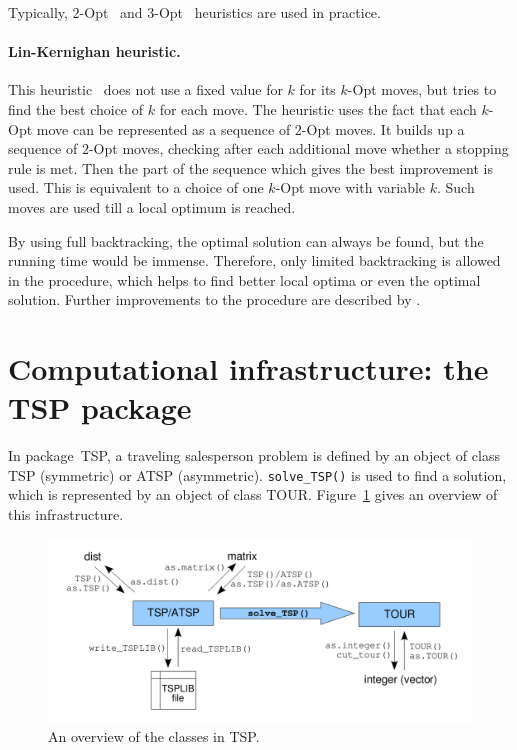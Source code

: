 \documentclass[10pt,a4paper,fleqn]{article}
\newcommand{\strong}[1]{{\normalfont\fontseries{b}\selectfont #1}}
\newcommand{\class}[1]{\mbox{\textsf{#1}}}
\newcommand{\func}[1]{\mbox{\texttt{#1()}}}
\newcommand{\pkg}[1]{\strong{#1}}
\begin{document}
Typically, $2$-Opt~\citep{Croes1958} and $3$-Opt~\citep{Lin1965} heuristics
are used in practice.

\paragraph{Lin-Kernighan heuristic.}

This heuristic~\citep{Lin1973} does not use a fixed value for $k$ for
its $k$-Opt moves, but tries to find the best choice of $k$ for each
move.  The heuristic uses the fact that each $k$-Opt move can be
represented as a sequence of $2$-Opt moves.  It builds up a sequence of
$2$-Opt moves, checking after each additional move whether a stopping
rule is met. Then the part of the sequence which gives the best
improvement is used. This is equivalent to a choice of one $k$-Opt move
with variable $k$. Such moves are used till a local optimum is reached.

By using full backtracking, the optimal solution can always be found, but the
running time would be immense. Therefore, only limited backtracking is allowed
in the procedure, which helps to find better local optima or even the optimal
solution. Further improvements to the procedure are described 
by \cite{Lin1973}.


\section{Computational infrastructure: the TSP package}
\label{sec:infrastructure}

In package~\pkg{TSP}, a traveling salesperson problem is
defined by an object of class \class{TSP} (symmetric) or \class{ATSP}
(asymmetric). \func{solve\_TSP} 
is used to find a solution, which is represented by
an object of class \class{TOUR}. Figure~\ref{fig:overview} gives an overview
of this infrastructure.

\begin{figure}
    \centering
    \includegraphics[width=14cm]{overview}
    \caption{An overview of the classes in \pkg{TSP}.\label{fig:overview}}
\end{figure}
\end{document}
